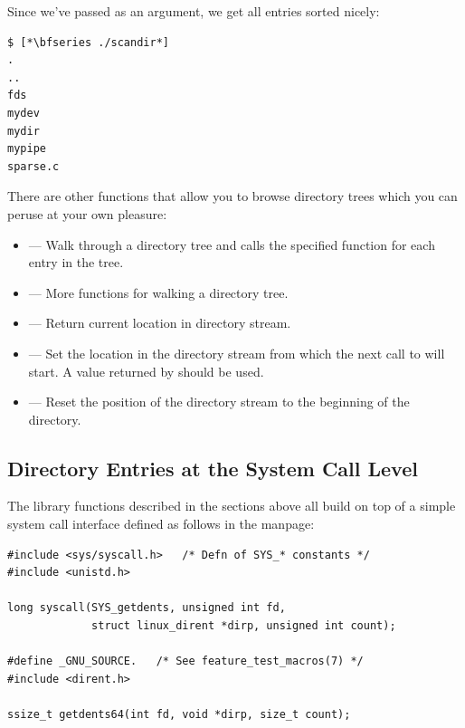 \noindent
Since we've passed  as an argument, we get all entries sorted nicely:

\begin{lstlisting}
$ [*\bfseries ./scandir*]
.
..
fds
mydev
mydir
mypipe
sparse.c
\end{lstlisting}

\noindent
There are other functions that allow you to browse directory trees which you can peruse at your own pleasure:

\begin{itemize}
	\item {} --- Walk through a directory tree and calls the specified function for each entry in the tree.
	\item {} --- More functions for walking a directory tree.
	\item {} --- Return current location in directory stream.
	\item {} --- Set the location in the directory  stream  from which  the next call to  
		will start. A value returned by  should be used.
	\item {} --- Reset the position of the directory stream to the beginning of the directory.
\end{itemize}


\subsection{Directory Entries at the System Call Level}

The library functions described in the sections above all build on top of a simple system call interface defined as follows in the  manpage:

\begin{lstlisting}
#include <sys/syscall.h>   /* Defn of SYS_* constants */
#include <unistd.h>

long syscall(SYS_getdents, unsigned int fd, 
             struct linux_dirent *dirp, unsigned int count);

#define _GNU_SOURCE.   /* See feature_test_macros(7) */
#include <dirent.h>

ssize_t getdents64(int fd, void *dirp, size_t count);
\end{lstlisting}

